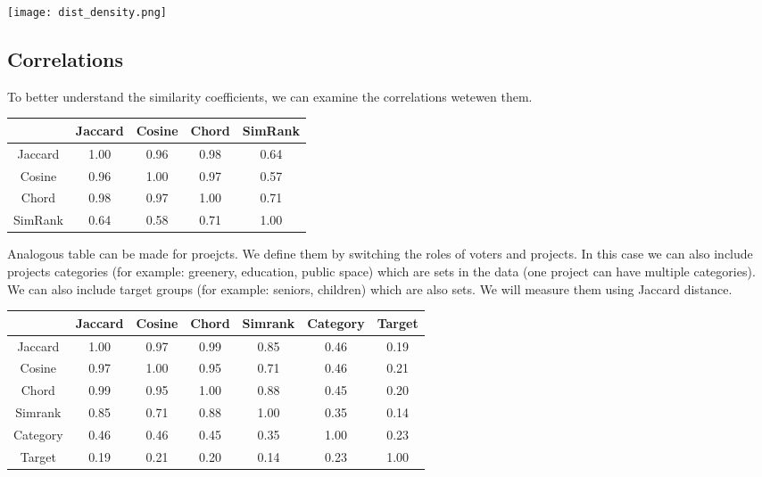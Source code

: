 \documentclass{article}
\begin{document}
\noindent
\texttt{[image: dist\_density.png]}

\subsection{Correlations}

To better understand the similarity coefficients, we can examine the
correlations wetewen them.

\begin{center}
\begin{tabular}{|c|cccc|}
  \hline
    & Jaccard & Cosine & Chord & SimRank \\
  \hline
  Jaccard & 1.00 & 0.96 & 0.98 & 0.64 \\
  Cosine  & 0.96 & 1.00 & 0.97 & 0.57 \\
  Chord   & 0.98 & 0.97 & 1.00 & 0.71 \\
  SimRank & 0.64 & 0.58 & 0.71 & 1.00 \\
  \hline
\end{tabular}
\end{center}

Analogous table can be made for proejcts. We define them by switching the roles
of voters and projects. In this case we can also include projects categories
(for example: greenery, education, public space) which are sets in the data
(one project can have multiple categories). We can also include target groups
(for example: seniors, children) which are also sets. We will measure them
using Jaccard distance.

\begin{center}
\begin{tabular}{|c|cccccc|}
  \hline
    & Jaccard & Cosine & Chord & Simrank & Category & Target \\
  \hline
  Jaccard & 1.00 & 0.97 & 0.99 & 0.85 & 0.46 & 0.19 \\
  Cosine & 0.97 & 1.00 & 0.95 & 0.71 & 0.46 & 0.21 \\
  Chord & 0.99 & 0.95 & 1.00 & 0.88 & 0.45 & 0.20 \\
  Simrank & 0.85 & 0.71 & 0.88 & 1.00 & 0.35 & 0.14 \\
  Category & 0.46 & 0.46 & 0.45 & 0.35 & 1.00	& 0.23 \\
  Target & 0.19 & 0.21 & 0.20 & 0.14 & 0.23	& 1.00 \\
  \hline
\end{tabular}
\end{center}
\end{document}
